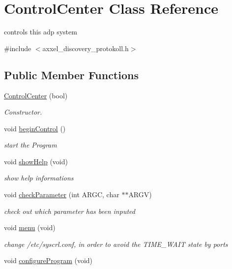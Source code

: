 \hypertarget{classControlCenter}{\section{Control\-Center Class Reference}
\label{classControlCenter}
}


controls this adp system  




{\ttfamily \#include $<$axxel\-\_\-discovery\-\_\-protokoll.\-h$>$}

\subsection*{Public Member Functions}
\begin{DoxyCompactItemize}
\item 
\hyperlink{classControlCenter_a3e88d2878430fc0375e9eb85f102da4e}{Control\-Center} (bool)
\begin{DoxyCompactList}\small\item\em Constructor. \end{DoxyCompactList}\item 
void \hyperlink{classControlCenter_a704ca612d363de83423ad11379520bec}{begin\-Control} ()
\begin{DoxyCompactList}\small\item\em start the Program \end{DoxyCompactList}\item 
\hypertarget{classControlCenter_a6c95b81bd573104c303821bb18777e62}{void \hyperlink{classControlCenter_a6c95b81bd573104c303821bb18777e62}{show\-Help} (void)}\label{classControlCenter_a6c95b81bd573104c303821bb18777e62}

\begin{DoxyCompactList}\small\item\em show help informations \end{DoxyCompactList}\item 
void \hyperlink{classControlCenter_a79c71093e6aac6436f3cdd16e0de4f11}{check\-Parameter} (int A\-R\-G\-C, char $\ast$$\ast$A\-R\-G\-V)
\begin{DoxyCompactList}\small\item\em check out which parameter has been inputed \end{DoxyCompactList}\item 
void \hyperlink{classControlCenter_a35b34a9192e2d04936d6743107dd1280}{menu} (void)
\begin{DoxyCompactList}\small\item\em change /etc/syscrl.conf, in order to avoid the T\-I\-M\-E\-\_\-\-W\-A\-I\-T state by ports \end{DoxyCompactList}\item 
\hypertarget{classControlCenter_a605a76009c7f66ea377f45b7ef0a1d18}{void \hyperlink{classControlCenter_a605a76009c7f66ea377f45b7ef0a1d18}{configure\-Program} (void)}\label{classControlCenter_a605a76009c7f66ea377f45b7ef0a1d18}


\end{DoxyCompactItemize}
